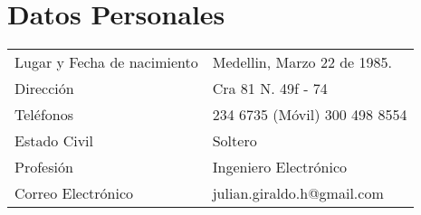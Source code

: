 \documentclass[a4paper, oneside, final, letter]{scrartcl}
\begin{document}
\begin{center}

\textsc{}

\section{Datos Personales}
\begin{tabularx}{0.97\linewidth}{p{6cm}X}
 Lugar y Fecha de nacimiento & Medellin, Marzo 22 de 1985.\\
 Direcci\'on & Cra 81 N. 49f - 74 \\
 Tel\'efonos & 234 6735 (M\'ovil) 300 498 8554\\
 Estado Civil & Soltero \\
 Profesi\'on & Ingeniero Electr\'onico \\
 Correo Electr\'onico & julian.giraldo.h@gmail.com
\end{tabularx}
\end{center}
\end{document}
